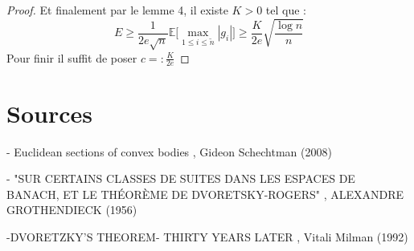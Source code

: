 \documentclass{report}
\begin{document}
\begin{proof}
	Et finalement par le lemme 4, il existe $K>0$ tel que :
	\begin{equation*}
		E\geq \frac{1}{2e\sqrt{n}} \mathbb{E}\big[\max_{1\leq i \leq \tilde{n}}|g_i|\big]\geq \frac{K}{2e}\sqrt{\frac{\log n}{n}}
	\end{equation*}
	Pour finir il suffit de poser $c=: \frac{K}{2e}$
\end{proof}


\newpage

\section{Sources}

- Euclidean sections of convex bodies , Gideon Schechtman (2008)

- "SUR CERTAINS CLASSES DE SUITES DANS LES ESPACES DE BANACH, ET LE THÉORÈME DE DVORETSKY-ROGERS" , ALEXANDRE GROTHENDIECK (1956) 

-DVORETZKY'S THEOREM- THIRTY YEARS LATER , Vitali Milman (1992)
\end{document}
